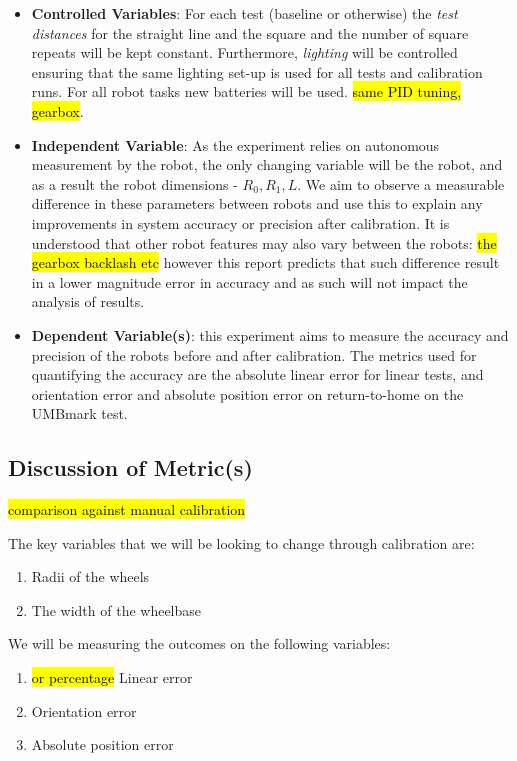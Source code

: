 \documentclass[conference]{IEEEtran}
\begin{document}
\begin{itemize}
    \item \textbf{Controlled Variables}: For each test (baseline or otherwise) the \emph{test distances} for the straight line and the square and the number of square repeats will be kept constant. Furthermore, \emph{lighting} will be controlled ensuring that the same lighting set-up is used for all tests and calibration runs. For all robot tasks new batteries will be used.
    \hl{same PID tuning, gearbox}.
    \item \textbf{Independent Variable}: As the experiment relies on autonomous measurement by the robot, the only changing variable will be the robot, and as a result the robot dimensions - $R_0, R_1, L$. We aim to observe a measurable difference in these parameters between robots and use this to explain any improvements in system accuracy or precision after calibration. It is understood that other robot features may also vary between the robots: \hl{the gearbox backlash etc} however this report predicts that such difference result in a lower magnitude error in accuracy and as such will not impact the analysis of results.
    \item \textbf{Dependent Variable(s)}: this experiment aims to measure the accuracy and precision of the robots before and after calibration. The metrics used for quantifying the accuracy are the absolute linear error for linear tests, and orientation error and absolute position error on return-to-home on the UMBmark test.
\end{itemize}


\subsection{Discussion of Metric(s)}


\hl{comparison against manual calibration}

The key variables that we will be looking to change through calibration are:
\begin{enumerate}
    \item Radii of the wheels
    \item The width of the wheelbase
\end{enumerate}

We will be measuring the outcomes on the following variables:
\begin{enumerate}
    \item \hl{or percentage} Linear error
    \item Orientation error
    \item Absolute position error
\end{enumerate}
\end{document}
